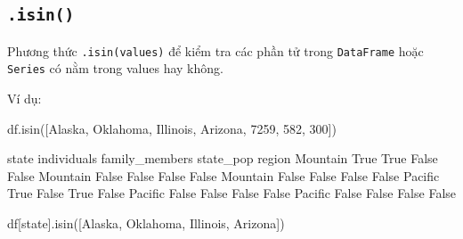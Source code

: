 \documentclass[
]{book}
\newenvironment{Shaded}{\begin{snugshade}}{\end{snugshade}}
\newcommand{\DecValTok}[1]{\textcolor[rgb]{0.00,0.00,0.81}{#1}}
\newcommand{\NormalTok}[1]{#1}
\newcommand{\StringTok}[1]{\textcolor[rgb]{0.31,0.60,0.02}{#1}}
\begin{document}
\subsection{\texorpdfstring{\texttt{.isin()}}{.isin()}}\label{isin}

Phương thức \texttt{.isin(values)} để kiểm tra các phần tử trong \texttt{DataFrame} hoặc \texttt{Series} có nằm trong values hay không.

Ví dụ:

\begin{Shaded}
\begin{Highlighting}[]
\NormalTok{df.isin([}\StringTok{\textquotesingle{}Alaska\textquotesingle{}}\NormalTok{, }\StringTok{\textquotesingle{}Oklahoma\textquotesingle{}}\NormalTok{, }\StringTok{\textquotesingle{}Illinois\textquotesingle{}}\NormalTok{, }\StringTok{\textquotesingle{}Arizona\textquotesingle{}}\NormalTok{, }\DecValTok{7259}\NormalTok{, }\DecValTok{582}\NormalTok{, }\DecValTok{300}\NormalTok{])}
\end{Highlighting}
\end{Shaded}

\begin{Shaded}
\begin{Highlighting}[]
\NormalTok{          state  individuals  family\_members  state\_pop}
\NormalTok{region                                                 }
\NormalTok{Mountain   True         True           False      False}
\NormalTok{Mountain  False        False           False      False}
\NormalTok{Mountain  False        False           False      False}
\NormalTok{Pacific    True        False            True      False}
\NormalTok{Pacific   False        False           False      False}
\NormalTok{Pacific   False        False           False      False}
\end{Highlighting}
\end{Shaded}

\begin{Shaded}
\begin{Highlighting}[]
\NormalTok{df[}\StringTok{\textquotesingle{}state\textquotesingle{}}\NormalTok{].isin([}\StringTok{\textquotesingle{}Alaska\textquotesingle{}}\NormalTok{, }\StringTok{\textquotesingle{}Oklahoma\textquotesingle{}}\NormalTok{, }\StringTok{\textquotesingle{}Illinois\textquotesingle{}}\NormalTok{, }\StringTok{\textquotesingle{}Arizona\textquotesingle{}}\NormalTok{])}
\end{Highlighting}
\end{Shaded}
\end{document}
